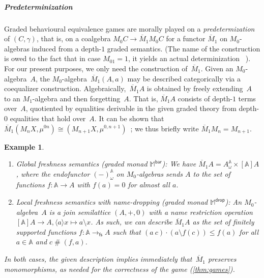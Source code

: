\documentclass[11pt,a4paper]{amsart}
\newtheorem{example}[example]{Example}
\newcommand{\Br}{\mathsf{bar}}
\newcommand{\drop}{\mathsf{drop}}
\newcommand{\fs}{\mathsf{fs}}
\newcommand{\Names}{\mathbb{A}}
\newcommand{\fresh}{\mathbin{\#}}
\newcommand{\bind}[1]{\langle #1\rangle}
\newcommand{\mbar}{\overline{M}_1}
\theoremstyle{plain}
\numberwithin{equation}{section}
\newcommand{\monad}{{\mathbb{M}}}
\newcommand{\+}[1]{\mathcal{#1}\xspace}
\theoremstyle{definition}
\begin{document}
\subparagraph*{Predeterminization} Graded behavioural equivalence
games are morally played on a \emph{predetermization} of $(C,\gamma)$,
that is, on a coalgebra $M_0C\to\mbar M_0C$ for a functor $\mbar$ on
$M_0$-algebras induced from a depth-$1$ graded semantics. (The name of
the construction is owed to the fact that in case $M_01=1$, it yields
an actual determinization%
~\cite{FordEA22}). For our present purposes, we only need the
construction of~$\mbar$. Given an $M_0$-algebra~$A$, the
$M_0$-algebra~$\mbar(A,a)$ may be described categorically via a
coequalizer construction. %
Algebraically,~$\mbar A$ is obtained by freely extending~$A$ to an
$M_1$-algebra and then forgetting~$A$. That is, $\mbar A$ consists of
depth-$1$ terms over~$A$, quotiented by equalities derivable in the
given graded theory from depth-$0$ equalities that hold over~$A$. It can be shown that
$\mbar(M_nX,\mu^{0n})\cong(M_{n+1}X,\mu^{0,n+1})$~\cite{FordEA22}; we thus
briefly write $\mbar M_n=M_{n+1}$.

\begin{example}
  \label{exp:m1-bar}
  \begin{enumerate}[wide]
  \item \label{item:m1-bar-global-freshness} \emph{Global freshness
      semantics (graded monad\/ $\monad^\Br$):} We have
    \(\mbar A = A^{\Names}_\omega \times [\Names]A\), where the
    endofunctor \((-)^{\Names}_\omega\) on $M_0$-algebras sends \(A\)
    to the set of functions \(f \colon \Names \to A\) with
    \(f(a) = 0\) for almost all \(a\).
  \item \label{item:m1-bar-local-freshness} \emph{Local freshness
      semantics with name-dropping (graded monad\/ $\monad^\drop$):} An
    \(M_0\)-algebra~\(A\) is a join semilattice $(A,+,0)$ with a name
    restriction operation
    \([\Names]A \to A, \bind{a}x \mapsto a \setminus x\).  As such, we
    can describe \(\mbar A\) as the set of finitely supported
    functions \(f\colon \Names \to_\fs A\) such that
    \((a\ c) \cdot (a \setminus f(c))\le f(a) \) for all
    \(a \in \Names\) and \(c \fresh (f, a)\). %

    \end{enumerate}
    In both cases, the given description
    implies immediately that~$\mbar$ preserves monomorphisms, as
    needed for the correctness of the game (\cref{thm:games}).
\end{example}
\end{document}
